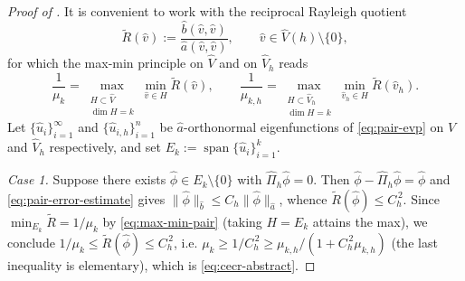 \documentclass[11pt]{article}
\theoremstyle{plain}
\theoremstyle{definition}
\theoremstyle{remark}
\begin{document}
\begin{proof}[Proof of ]
It is convenient to work with the reciprocal Rayleigh quotient
\[
  \widetilde R(\widehat v)
  := \frac{\widehat b(\widehat v,\widehat v)}{\widehat a(\widehat v,\widehat v)},
  \qquad \widehat v\in\widehat V(h)\setminus\{0\},
\]
for which the max-min principle on $\widehat V$ and on $\widehat V_h$
reads
\begin{equation}
\label{eq:max-min-pair}
  \frac{1}{\mu_k}
  = \max_{\substack{H\subset\widehat V\\\dim H=k}}
    \min_{\widehat v\in H}\widetilde R(\widehat v),
  \qquad
  \frac{1}{\mu_{k,h}}
  = \max_{\substack{H\subset\widehat V_h\\\dim H=k}}
    \min_{\widehat v_h\in H}\widetilde R(\widehat v_h).
\end{equation}
Let $\{\widehat u_i\}_{i=1}^{\infty}$ and
$\{\widehat u_{i,h}\}_{i=1}^{n}$ be $\widehat a$-orthonormal
eigenfunctions of \eqref{eq:pair-evp} on $\widehat V$ and $\widehat V_h$
respectively, and set $E_k:=\operatorname{span}\{\widehat u_i\}_{i=1}^{k}$.

\medskip
\emph{Case 1.} Suppose there exists
$\widehat\phi\in E_k\setminus\{0\}$ with
$\widehat\Pi_h\widehat\phi=0$. Then
$\widehat\phi-\widehat\Pi_h\widehat\phi=\widehat\phi$ and
\eqref{eq:pair-error-estimate} gives
$\|\widehat\phi\|_{\widehat b}
\le C_h\|\widehat\phi\|_{\widehat a}$, whence
$\widetilde R(\widehat\phi)\le C_h^{\,2}$. Since
$\min_{E_k}\widetilde R=1/\mu_k$ by \eqref{eq:max-min-pair}
(taking $H=E_k$ attains the max), we conclude
$1/\mu_k\le\widetilde R(\widehat\phi)\le C_h^{\,2}$, i.e.
$\mu_k\ge 1/C_h^{\,2}\ge\mu_{k,h}/(1+C_h^{\,2}\mu_{k,h})$
(the last inequality is elementary), which is \eqref{eq:cecr-abstract}.


\end{proof}
\end{document}
